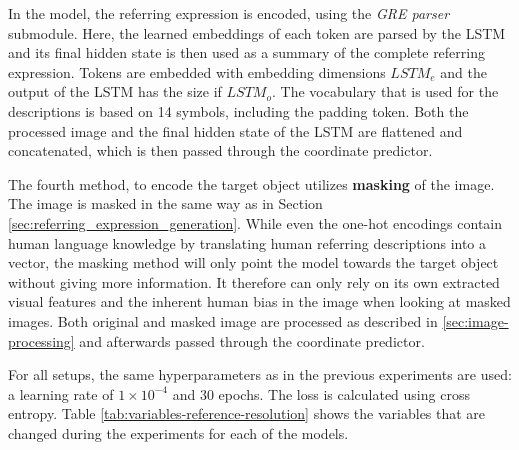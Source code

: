 In the model, the referring expression is encoded, using the \emph{GRE parser} submodule.
Here, the learned embeddings of each token are parsed by the LSTM and its final hidden state is then used as a summary of the complete referring expression.
Tokens are embedded with embedding dimensions $LSTM_e$ and the output of the LSTM has the size if $LSTM_o$.
The vocabulary that is used for the descriptions is based on 14 symbols, including the padding token.
Both the processed image and the final hidden state of the LSTM are flattened and concatenated, which is then passed through the coordinate predictor.

The fourth method, to encode the target object utilizes \textbf{masking} of the image.
The image is masked in the same way as in Section \ref{sec:referring_expression_generation}.
While even the one-hot encodings contain human language knowledge by translating human referring descriptions into a vector, the masking method will only point the model towards the target object without giving more information.
It therefore can only rely on its own extracted visual features and the inherent human bias in the image when looking at masked images.
Both original and masked image are processed as described in \ref{sec:image-processing} and afterwards passed through the coordinate predictor.

For all setups, the same hyperparameters as in the previous experiments are used: a learning rate of $1\times10^{-4}$ and 30 epochs.
The loss is calculated using cross entropy.
Table \ref{tab:variables-reference-resolution} shows the variables that are changed during the experiments for each of the models.

